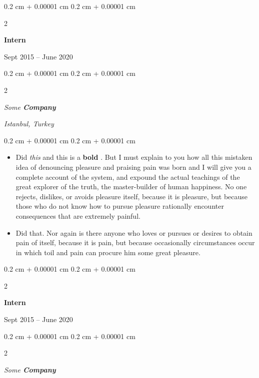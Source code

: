 \documentclass[10pt, letterpaper]{article}
\newenvironment{highlights}{
    \begin{itemize}[
        topsep=0.10 cm,
        parsep=0.10 cm,
        partopsep=0pt,
        itemsep=0pt,
        leftmargin=0.4 cm + 10pt
    ]
}{
    \end{itemize}
} %
\newenvironment{onecolentry}{
    \begin{adjustwidth}{
        0.2 cm + 0.00001 cm
    }{
        0.2 cm + 0.00001 cm
    }
}{
    \end{adjustwidth}
} %
\newenvironment{twocolentry}[2][]{
    \onecolentry
    \def\secondColumn{#2}
    \setcolumnwidth{\fill, 4.5 cm}
    \begin{paracol}{2}
}{
    \switchcolumn \raggedleft \secondColumn
    \end{paracol}
    \endonecolentry
} %
\let\hrefWithoutArrow\href
\renewcommand{\href}[2]{\hrefWithoutArrow{#1}{\ifthenelse{\equal{#2}{}}{ }{#2 }\raisebox{.15ex}{\footnotesize \faExternalLink*}}}
\begin{document}
        \vspace{0.2 cm}

                \begin{twocolentry}{
                    Sept 2015 – June 2020
                }
                \textbf{Intern}
                \end{twocolentry}
            \begin{twocolentry}{
        \textit{Istanbul, Turkey}    }
            \textit{Some \textbf{Company}}
            \end{twocolentry}

        \vspace{0.10 cm}
        \begin{onecolentry}
            \begin{highlights}
                \item Did \textit{this} and this is a \textbf{bold} \href{https://example.com}{link}. But I must explain to you how all this mistaken idea of denouncing pleasure and praising pain was born and I will give you a complete account of the system, and expound the actual teachings of the great explorer of the truth, the master-builder of human happiness. No one rejects, dislikes, or avoids pleasure itself, because it is pleasure, but because those who do not know how to pursue pleasure rationally encounter consequences that are extremely painful.
                \item Did that. Nor again is there anyone who loves or pursues or desires to obtain pain of itself, because it is pain, but because occasionally circumstances occur in which toil and pain can procure him some great pleasure.
            \end{highlights}
        \end{onecolentry}


        \vspace{0.2 cm}

                \begin{twocolentry}{
                    Sept 2015 – June 2020
                }
                \textbf{Intern}
                \end{twocolentry}
            \begin{twocolentry}{
            }
            \textit{Some \textbf{Company}}
            \end{twocolentry}
\end{document}

